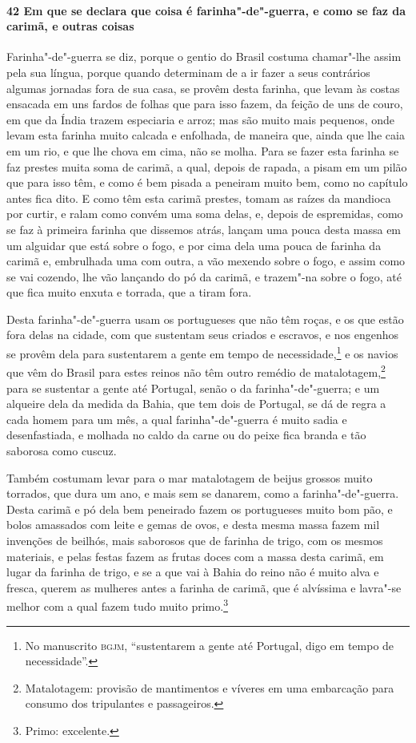\begin{linenumbers}
\paragraph{42 Em que se declara que coisa é farinha"-de"-guerra, e como se faz da carimã, e outras coisas}\quad
Farinha"-de"-guerra se diz, porque o gentio do Brasil costuma chamar"-lhe assim pela sua
língua, porque quando determinam de a ir fazer a seus contrários algumas jornadas fora de
sua casa, se provêm desta farinha, que levam às costas ensacada em uns fardos de folhas
que para isso fazem, da feição de uns de couro, em que da Índia trazem especiaria e arroz;
mas são muito mais pequenos, onde levam esta farinha muito calcada e enfolhada, de maneira
que, ainda que lhe caia em um rio, e que lhe chova em cima, não se molha. Para se fazer
esta farinha se faz prestes muita soma de carimã, a qual, depois de rapada, a pisam em um
pilão que para isso têm, e como é bem pisada a peneiram muito bem, como no capítulo antes
fica dito. E como têm esta carimã prestes, tomam as raízes da mandioca por curtir, e ralam
como convém uma soma delas, e, depois de espremidas, como se faz à primeira farinha que
dissemos atrás, lançam uma pouca desta massa em um alguidar que está sobre o fogo, e por
cima dela uma pouca de farinha da carimã e, embrulhada uma com outra, a vão mexendo sobre
o fogo, e assim como se vai cozendo, lhe vão lançando do pó da carimã, e trazem"-na sobre o
fogo, até que fica muito enxuta e torrada, que a tiram fora.

Desta farinha"-de"-guerra usam os portugueses que não têm roças, e os que estão fora delas
na cidade, com que sustentam seus criados e escravos, e nos engenhos se provêm dela para
sustentarem a gente em tempo de necessidade,\footnote{ No manuscrito \textsc{bgjm},
``sustentarem a gente até Portugal, digo em tempo de necessidade''.} e os navios que vêm
do Brasil para estes reinos não têm outro remédio de matalotagem,\footnote{ Matalotagem:
provisão de mantimentos e víveres em uma embarcação para consumo dos tripulantes e
passageiros.} para se sustentar a gente até Portugal, senão o da farinha"-de"-guerra; e um
alqueire dela da medida da Bahia, que tem dois de Portugal, se dá de regra a cada homem
para um mês, a qual farinha"-de"-guerra é muito sadia e desenfastiada, e molhada no caldo da
carne ou do peixe fica branda e tão saborosa como cuscuz.

Também costumam levar para o mar matalotagem de beijus grossos muito torrados, que dura um
ano, e mais sem se danarem, como a farinha"-de"-guerra. Desta carimã e pó dela bem peneirado
fazem os portugueses muito bom pão, e bolos amassados com leite e gemas de ovos, e desta
mesma massa fazem mil invenções de beilhós, mais saborosos que de farinha de trigo, com os
mesmos materiais, e pelas festas fazem as frutas doces com a
massa desta carimã, em lugar da farinha de trigo, e se a que vai à Bahia do reino não é
muito alva e fresca, querem as mulheres antes a farinha de carimã, que é alvíssima e
lavra"-se melhor com a qual fazem tudo muito primo.\footnote{ Primo: excelente.}


\end{linenumbers}

